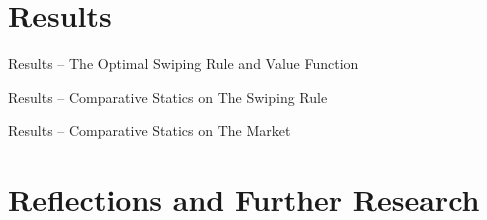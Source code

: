 \documentclass[10pt, aspectratio=169,xcolor=dvipsnames]{beamer}
\begin{document}
\section{Results}
\begin{frame}{Results – The Optimal Swiping Rule and Value Function} 
\end{frame}
\begin{frame}{Results – Comparative Statics on The Swiping Rule} 
\end{frame}
\begin{frame}{Results – Comparative Statics on The Market}  
\end{frame}

\section{Reflections and Further Research}
\end{document}
